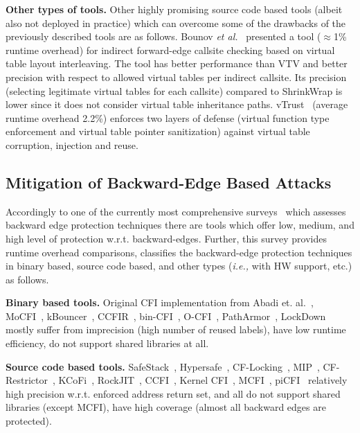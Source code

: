 \textbf{Other types of tools.} Other highly promising source code based tools (albeit also not deployed in practice) 
which can overcome some of the drawbacks of the previously described tools are as follows. 
Bounov \textit{et al.}~\cite{bounov:interleaving} presented a tool ($\approx$1\% runtime overhead)
for indirect forward-edge callsite checking based on virtual table layout interleaving. The tool has better performance than VTV and better precision with
respect to allowed virtual tables per indirect callsite. Its precision (selecting legitimate virtual tables for each callsite) compared to ShrinkWrap is
lower since it does not consider virtual table inheritance paths. vTrust~\cite{zhang:vtrust} (average runtime overhead 2.2\%) enforces two layers of defense
(virtual function type enforcement and virtual table pointer sanitization) against virtual table corruption, injection and reuse. 

\subsection{Mitigation of Backward-Edge Based Attacks}
\label{Mitigation of Return Edge Attacks}
Accordingly to one of the currently most comprehensive surveys~\cite{cfi:survey} which assesses backward edge protection techniques there are tools which
offer low, medium, and high level of protection w.r.t. backward-edges. Further, this survey 
provides runtime overhead comparisons,
classifies the backward-edge protection techniques 
in binary based, source code based, and other types (\textit{i.e.,} with HW support, etc.) as follows.

\textbf{Binary based tools.} Original CFI implementation from Abadi et. al.~\cite{abadi:cfi2}, MoCFI~\cite{mocfi}, 
kBouncer~\cite{kbouncer}, 
CCFIR~\cite{ccfir:zhang}, bin-CFI~\cite{mingwei:sekar}, O-CFI~\cite{mohan:opaque}, 
PathArmor~\cite{veen:cfi}, 
LockDown~\cite{payer:dimva} mostly suffer from imprecision (high number of reused labels), 
have low runtime efficiency, do not support shared libraries at all.

\textbf{Source code based tools.} SafeStack~\cite{safestack}, Hypersafe~\cite{hypersafe}, CF-Locking~\cite{cflocking}, MIP~\cite{mip}, 
CF-Restrictor~\cite{cfrestrictor}, KCoFi~\cite{kcocfi}, RockJIT~\cite{rockjit:niu}, CCFI~\cite{ccfi:jose}, 
Kernel CFI~\cite{kernelcfi}, MCFI~\cite{mcfi:niu}, piCFI~\cite{perinput:niu} relatively high precision
w.r.t. enforced address return set, and all do not support shared libraries (except MCFI), have high coverage (almost all backward edges are protected).

